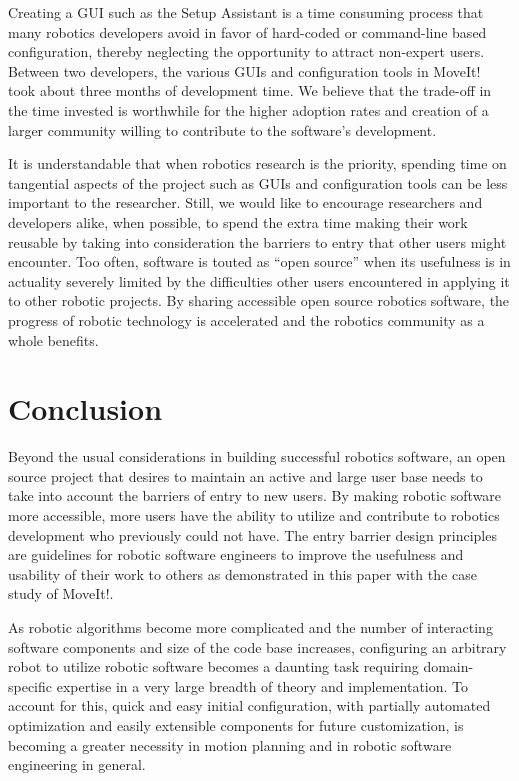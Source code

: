 \documentclass[10pt,journal,compsoc]{joser1}
\begin{document}
{Creating a GUI such as the Setup Assistant is a time consuming process that many robotics developers avoid in favor of hard-coded or command-line based configuration, thereby neglecting the opportunity to attract non-expert users. Between two developers, the various GUIs and configuration tools in MoveIt! took about three months of development time. We believe that the trade-off in the time invested is worthwhile for the higher adoption rates and creation of a larger community willing to contribute to the software's development. 

It is understandable that when robotics research is the priority, spending time on tangential aspects of the project such as GUIs and configuration tools can be less important to the researcher. Still, we would like to encourage researchers and developers alike, when possible, to spend the extra time making their work reusable by taking into consideration the barriers to entry that other users might encounter. Too often, software is touted as ``open source'' when its usefulness is in actuality severely limited by the difficulties other users encountered in applying it to other robotic projects. By sharing accessible open source robotics software, the progress of robotic technology is accelerated and the robotics community as a whole benefits.

\section{Conclusion}
\label{sec::conclusion}

Beyond the usual considerations in building successful robotics software, an open source project that desires to maintain an active and large user base needs to take into account the barriers of entry to new users. By making robotic software more accessible, more users have the ability to utilize and contribute to robotics development who previously could not have. The entry barrier design principles are guidelines for robotic software engineers to improve the usefulness and usability of their work to others as demonstrated in this paper with the case study of MoveIt!.

As robotic algorithms become more complicated and the number of interacting software components and size of the code base increases, configuring an arbitrary robot to utilize robotic software becomes a daunting task requiring domain-specific expertise in a very large breadth of theory and implementation. To account for this, quick and easy initial configuration, with partially automated optimization and easily extensible components for future customization, is becoming a greater necessity in motion planning and in robotic software engineering in general. 

}
\end{document}
